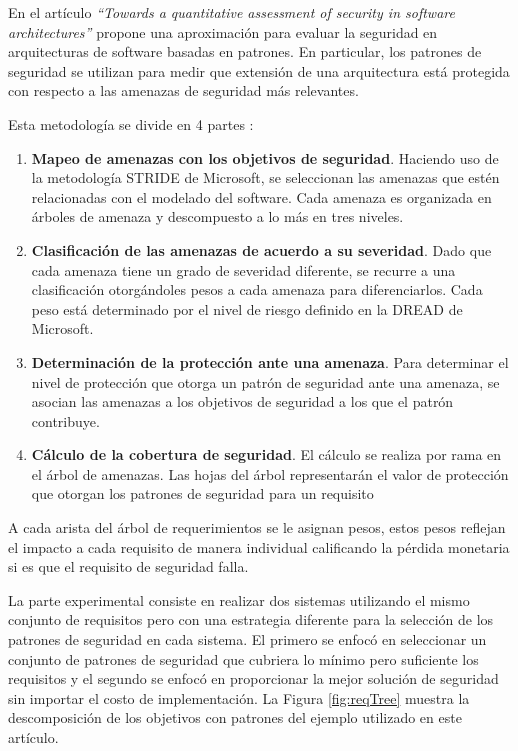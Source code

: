 En el artículo \textit{``Towards a quantitative assessment of security in software architectures''} \cite{YauScaHey} propone una aproximación para evaluar la seguridad en arquitecturas de software basadas en patrones. En particular, los patrones de seguridad se utilizan para medir que extensión de una arquitectura está protegida con respecto a las amenazas de seguridad más relevantes. 

\vspace{0.3cm}

Esta metodología se divide en 4 partes \cite{YauScaHey}:

\begin{enumerate}[noitemsep]
	\item \textbf{Mapeo de amenazas con los objetivos de seguridad}. Haciendo uso de la metodología STRIDE de Microsoft, se seleccionan las amenazas que estén relacionadas con el modelado del software. Cada amenaza es organizada en árboles de amenaza y descompuesto a lo más en tres niveles.
	\item \textbf{Clasificación de las amenazas de acuerdo a su severidad}. Dado que cada amenaza tiene un grado de severidad diferente, se recurre a una clasificación otorgándoles pesos a cada amenaza para diferenciarlos. Cada peso está determinado por el nivel de riesgo definido en la DREAD de Microsoft. 
	\item \textbf{Determinación de la protección ante una amenaza}. Para determinar el nivel de protección que otorga un patrón de seguridad ante una amenaza, se asocian las amenazas a los objetivos de seguridad a los que el patrón contribuye. 
	\item \textbf{Cálculo de la cobertura de seguridad}. El cálculo se realiza por rama en el árbol de amenazas. Las hojas del árbol representarán el valor de protección que otorgan los patrones de seguridad para un requisito
\end{enumerate}

A cada arista del árbol de requerimientos se le asignan pesos, estos pesos reflejan el impacto a cada requisito de manera individual calificando la pérdida monetaria si es que el requisito de seguridad falla.

\vspace{0.3cm}

La parte experimental consiste en realizar dos sistemas utilizando el mismo conjunto de requisitos pero con una estrategia diferente para la selección de los patrones de seguridad en cada sistema. El primero se enfocó en seleccionar un conjunto de patrones de seguridad que cubriera lo mínimo pero suficiente los requisitos y el segundo se enfocó en proporcionar la mejor solución de seguridad sin importar el costo de implementación. La Figura \ref{fig:reqTree} muestra la descomposición de los objetivos con patrones del ejemplo utilizado en este artículo.

